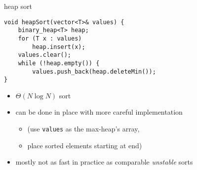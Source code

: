 \begin{frame}[fragile,label=heapSort]{heap sort}
\lstset{language=C++,style=smaller}
\begin{lstlisting}
void heapSort(vector<T>& values) {
    binary_heap<T> heap; 
    for (T x : values)
        heap.insert(x);
    values.clear();
    while (!heap.empty()) {
        values.push_back(heap.deleteMin());
}
\end{lstlisting}
\begin{itemize}
\item $\Theta(N \log N)$ sort 
\item can be done in place with more careful implementation
    \begin{itemize}
    \item (use \texttt{values} as the max-heap's array,
    \item place sorted elements starting at end)
    \end{itemize}
\item mostly not as fast in practice as comparable \textit{unstable} sorts
\end{itemize}
\end{frame}
